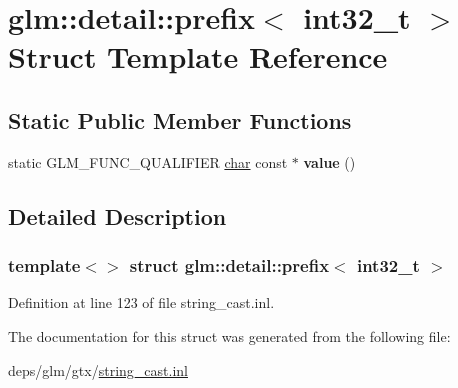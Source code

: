 \hypertarget{structglm_1_1detail_1_1prefix_3_01int32__t_01_4}{}\section{glm\+:\+:detail\+:\+:prefix$<$ int32\+\_\+t $>$ Struct Template Reference}
\label{structglm_1_1detail_1_1prefix_3_01int32__t_01_4}
\subsection*{Static Public Member Functions}
\begin{DoxyCompactItemize}
\item 
\mbox{\label{structglm_1_1detail_1_1prefix_3_01int32__t_01_4_a1e2bfac810e1195fa173ebca0dcdca57}} 
static G\+L\+M\+\_\+\+F\+U\+N\+C\+\_\+\+Q\+U\+A\+L\+I\+F\+I\+ER \hyperlink{classchar}{char} const  $\ast$ {\bfseries value} ()
\end{DoxyCompactItemize}


\subsection{Detailed Description}
\subsubsection*{template$<$$>$\newline
struct glm\+::detail\+::prefix$<$ int32\+\_\+t $>$}



Definition at line 123 of file string\+\_\+cast.\+inl.



The documentation for this struct was generated from the following file\+:\begin{DoxyCompactItemize}
\item 
deps/glm/gtx/\hyperlink{string__cast_8inl}{string\+\_\+cast.\+inl}\end{DoxyCompactItemize}
